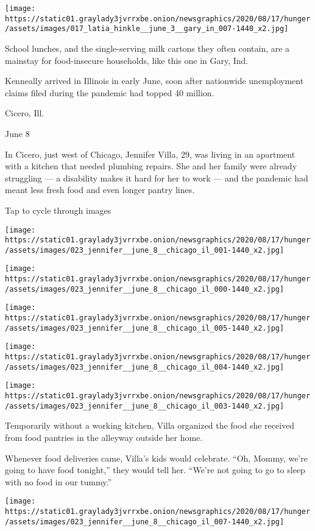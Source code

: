 \texttt{[image: https://static01.graylady3jvrrxbe.onion/newsgraphics/2020/08/17/hunger/assets/images/017\_latia\_hinkle\_\_june\_3\_\_gary\_in\_007-1440\_x2.jpg]}

School lunches, and the single-serving milk cartons they often contain,
are a mainstay for food-insecure households, like this one in Gary, Ind.

Kenneally arrived in Illinois in early June, soon after nationwide
unemployment claims filed during the pandemic had topped 40 million.

Cicero, Ill.

June 8

In Cicero, just west of Chicago, Jennifer Villa, 29, was living in an
apartment with a kitchen that needed plumbing repairs. She and her
family were already struggling --- a disability makes it hard for her to
work --- and the pandemic had meant less fresh food and even longer
pantry lines.

Tap to cycle through images

\texttt{[image: https://static01.graylady3jvrrxbe.onion/newsgraphics/2020/08/17/hunger/assets/images/023\_jennifer\_\_june\_8\_\_chicago\_il\_001-1440\_x2.jpg]}

\texttt{[image: https://static01.graylady3jvrrxbe.onion/newsgraphics/2020/08/17/hunger/assets/images/023\_jennifer\_\_june\_8\_\_chicago\_il\_000-1440\_x2.jpg]}

\texttt{[image: https://static01.graylady3jvrrxbe.onion/newsgraphics/2020/08/17/hunger/assets/images/023\_jennifer\_\_june\_8\_\_chicago\_il\_005-1440\_x2.jpg]}

\texttt{[image: https://static01.graylady3jvrrxbe.onion/newsgraphics/2020/08/17/hunger/assets/images/023\_jennifer\_\_june\_8\_\_chicago\_il\_004-1440\_x2.jpg]}

\texttt{[image: https://static01.graylady3jvrrxbe.onion/newsgraphics/2020/08/17/hunger/assets/images/023\_jennifer\_\_june\_8\_\_chicago\_il\_003-1440\_x2.jpg]}

Temporarily without a working kitchen, Villa organized the food she
received from food pantries in the alleyway outside her home.

Whenever food deliveries came, Villa's kids would celebrate. ``Oh,
Mommy, we're going to have food tonight,'' they would tell her. ``We're
not going to go to sleep with no food in our tummy.''

\texttt{[image: https://static01.graylady3jvrrxbe.onion/newsgraphics/2020/08/17/hunger/assets/images/023\_jennifer\_\_june\_8\_\_chicago\_il\_007-1440\_x2.jpg]}

